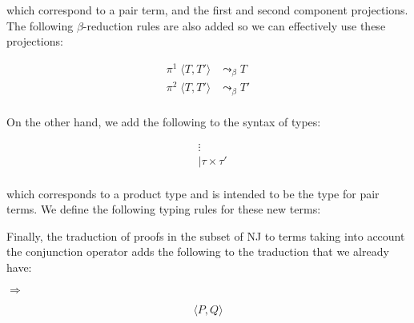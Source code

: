\documentclass{article}
\begin{document}
which correspond to a pair term, and the first and second 
component projections. The following $\beta$-reduction 
rules are also added so we can effectively use these 
projections:

\begin{align*}
  \pi^1\;\langle T, T' \rangle &\leadsto_\beta T\\
  \pi^2\;\langle T, T' \rangle &\leadsto_\beta T'\\
\end{align*}

On the other hand, we add the following to the syntax 
of types:

\begin{align*}
  &\vdots\\
  &|\tau \times \tau'\\
\end{align*}

which corresponds to a product type and is intended to be
the type for pair terms. We define the following typing rules 
for these new terms:

\begin{mathpar}
\end{mathpar}

\begin{minipage}[t][2cm][t]{.4\textwidth}
\begin{mathpar}
\end{mathpar}
\end{minipage}
\hfill
\begin{minipage}[t]{.4\textwidth}
\begin{mathpar}
\end{mathpar}
\end{minipage}

Finally, the traduction of proofs in the subset of NJ 
to terms taking into account the conjunction operator 
adds the following to the traduction that we already 
have:

\begin{minipage}[c][2cm][c]{.4\textwidth}
\begin{mathpar}
\end{mathpar}
\end{minipage}
$\Longrightarrow$
\begin{minipage}[c]{.4\textwidth}
$$\langle P, Q \rangle$$
\end{minipage}
\end{document}
